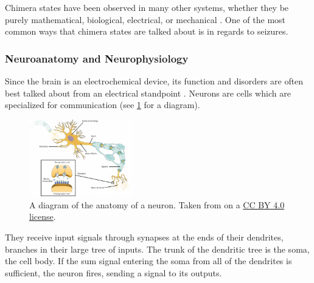 Chimera states have been observed in many other systems, whether they be purely mathematical, biological, electrical, or mechanical \cite{Shanahan2010,Abrams2004,Andrzejak2016,Hizanidis2016,Kuramoto2002,Martens2013,Panaggio2015,Santos2015,Santos2017,Kruk2018,Xie2014}.
One of the most common ways that chimera states are talked about is in regards to seizures.

\subsubsection{Neuroanatomy and Neurophysiology}
\label{sec:intro_seizures_neuroanatomy}
Since the brain is an electrochemical device, its function and disorders are often best talked about from an electrical standpoint \cite{Deco2008}.
Neurons are cells which are specialized for communication (see \cref{fig:neuron_diagram} for a diagram).
\begin{figure}[ht]
  \centering
  \includegraphics[width=0.4\textwidth]{figure/neuron_diagram.pdf}
  \caption[Neuron diagram]{A diagram of the anatomy of a neuron.
    Taken from \cite{Molnar2013} on a \href{https://creativecommons.org/licenses/by/4.0/}{CC BY 4.0 license}.
  }
  \label{fig:neuron_diagram}
\end{figure}
They receive input signals through synapses at the ends of their dendrites, branches in their large tree of inputs.
The trunk of the dendritic tree is the soma, the cell body.
If the sum signal entering the soma from all of the dendrites is sufficient, the neuron fires, sending a signal to its outputs.

